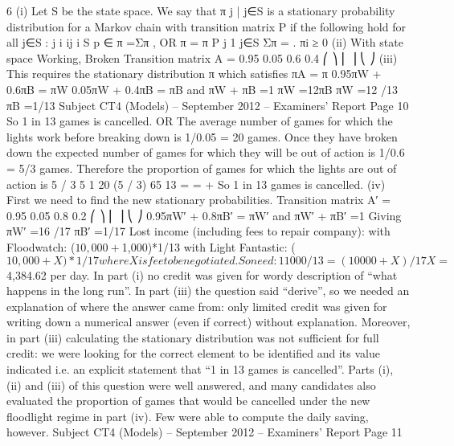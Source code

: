 6
(i) Let S be the state space. We say that {π j | j∈S} is a stationary probability
distribution for a Markov chain with transition matrix P if the following
hold for all j∈S :
j i ij
i S
p
∈
π =Σπ , OR π = π P
j 1
j∈S
Σπ = .
πi ≥ 0
(ii) With state space {Working, Broken}
Transition matrix A =
0.95 0.05
0.6 0.4
⎛ ⎞
⎜ ⎟
⎝ ⎠
(iii) This requires the stationary distribution π which satisfies
πA = π
0.95πW + 0.6πB = πW
0.05πW + 0.4πB = πB
and πW + πB =1
πW =12πB
πW =12 /13
πB =1/13
Subject CT4 (Models) – September 2012 – Examiners’ Report
Page 10
So 1 in 13 games is cancelled.
OR
The average number of games for which the lights work before breaking
down is 1/0.05 = 20 games.
Once they have broken down the expected number of games for which
they will be out of action is 1/0.6 = 5/3 games.
Therefore the proportion of games for which the lights are out of action
is
5 / 3 5 1
20 (5 / 3) 65 13
= =
+
So 1 in 13 games is cancelled.
(iv) First we need to find the new stationary probabilities.
Transition matrix A′ =
0.95 0.05
0.8 0.2
⎛ ⎞
⎜ ⎟
⎝ ⎠
0.95πW′ + 0.8πB′ = πW′
and πW′ + πB′ =1
Giving πW′ =16 /17 πB′ =1/17
Lost income (including fees to repair company):
with Floodwatch: ($10,000 + $1,000)*1/13
with Light Fantastic: ($10,000 + X)*1/17 where X is fee to be negotiated.
So need: 11000/13 = (10000 + X)/17
X = $4,384.62 per day.
In part (i) no credit was given for wordy description of “what happens in the long run”.
In part (iii) the question said “derive”, so we needed an explanation of where the answer
came from: only limited credit was given for writing down a numerical answer (even if
correct) without explanation. Moreover, in part (iii) calculating the stationary distribution
was not sufficient for full credit: we were looking for the correct element to be identified and
its value indicated i.e. an explicit statement that “1 in 13 games is cancelled”. Parts (i), (ii)
and (iii) of this question were well answered, and many candidates also evaluated the
proportion of games that would be cancelled under the new floodlight regime in part (iv).
Few were able to compute the daily saving, however.
Subject CT4 (Models) – September 2012 – Examiners’ Report
Page 11
